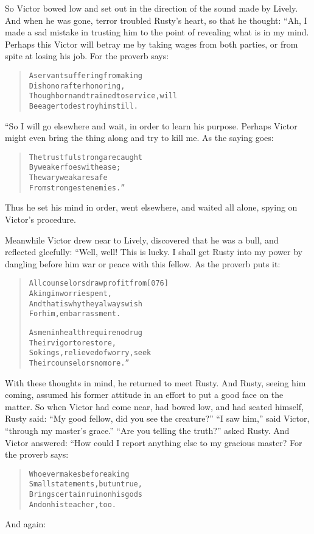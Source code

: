 \documentclass[article, twoside, 14pt]{memoir}
\renewenvironment{verbatim}{%
\begin{quote}%
\vskip -10pt%
\begin{alltt}\normalfont\large}{\end{alltt}%
\end{quote}%
\vskip -10pt
} %
\begin{document}
So Victor bowed low and set out in the direction of the sound made
by Lively. And when he was gone, terror troubled Rusty's heart, so
that he thought: “Ah, I made a sad mistake in trusting him to the
point of revealing what is in my mind. Perhaps this Victor will
betray me by taking wages from both parties, or from spite at
losing his job. For the proverb says:

\begin{verbatim}
A servant suffering from a king
Dishonor after honoring,
Though born and trained to service, will
Be eager to destroy him still.
\end{verbatim}
“So I will go elsewhere and wait, in order to learn his purpose.
Perhaps Victor might even bring the thing along and try to kill me.
As the saying goes:

\begin{verbatim}
The trustful strong are caught
    By weaker foes with ease;
The wary weak are safe
    From strongest enemies.”
\end{verbatim}
Thus he set his mind in order, went elsewhere, and waited all
alone, spying on Victor's procedure.

Meanwhile Victor drew near to Lively, discovered that he was a
bull, and reflected gleefully: “Well, well! This is lucky. I shall
get Rusty into my power by dangling before him war or peace with
this fellow. As the proverb puts it:

\begin{verbatim}
All counselors draw profit from                         [076]
    A king in worries pent,
And that is why they always wish
    For him, embarrassment.

As men in health require no drug
    Their vigor to restore,
So kings, relieved of worry, seek
    Their counselors no more.”
\end{verbatim}
With these thoughts in mind, he returned to meet Rusty. And Rusty,
seeing him coming, assumed his former attitude in an effort to put
a good face on the matter. So when Victor had come near, had bowed
low, and had seated himself, Rusty said:
``My good fellow, did you see the creature?'' ``I saw him,'' said
Victor, ``through my master's grace.''
``Are you telling the truth?'' asked Rusty. And Victor answered:
“How could I report anything else to my gracious master? For the
proverb says:

\begin{verbatim}
Whoever makes before a king
    Small statements, but untrue,
Brings certain ruin on his gods
    And on his teacher, too.
\end{verbatim}
And again:
\end{document}
